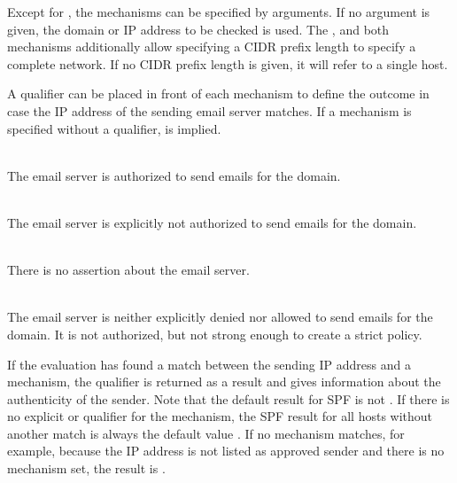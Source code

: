 Except for , the mechanisms can be specified by arguments. If no argument is given, the domain or IP address to be checked is used.
The ,  and both  mechanisms additionally allow specifying a CIDR prefix length to  specify a complete network.
If no CIDR prefix length is given, it will refer to a single host.

A qualifier can be placed in front of each mechanism to define the outcome in case the IP address of the sending email server matches.
If a mechanism is specified without a qualifier,  is implied.

\begin{description}
\setlength{\itemsep}{2pt}
\item[\spfcode{+} \hspace{5pt}{\mdseries (pass)}]\hfill \\
{
The email server is authorized to send emails for the domain.
}

\item[\spfcode{-} \hspace{5pt}{\mdseries (fail)}]\hfill \\
{
The email server is explicitly not authorized to send emails for the domain.  
}

\item[\spfcode{?} \hspace{5pt}{\mdseries (neutral)}]\hfill \\
{
There is no assertion about the email server.
}

\item[\spfcode{\softfail} \hspace{4pt}{\mdseries (softfail)}]\hfill \\
{
The email server is neither explicitly denied nor allowed to send emails for the domain. It is not authorized, but not strong enough to create a strict policy.
}
\end{description}

If the evaluation has found a match between the sending IP address and a mechanism, the qualifier is returned as a result and gives information about the authenticity of the sender.
Note that the default result for \ac{SPF} is not .
If there is no explicit  or  qualifier for the  mechanism, the SPF result for all hosts without another match is always the default value .
If no mechanism matches, for example, because the IP address is not listed as approved sender and there is no  mechanism set, the result is .

